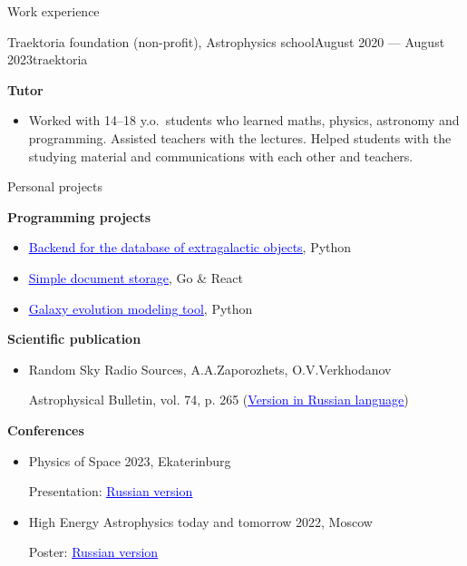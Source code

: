 \documentclass{resume} %
\newcommand{\link}[2]{\href{#1}{\textcolor{blue}{\underline{#2}}}}
\newcommand{\subheader}[2]{
	{\textbf{#1}} \ifthenelse{\equal{#2}{}}{}{\timestamp{#2}}
}
\begin{document}
\begin{rSection}{Work experience}
		\vspace{1em}

		\begin{rSubsection}{Traektoria foundation (non-profit), Astrophysics school}{August 2020 --- August 2023}{}{}{traektoria}
			\item \subheader{Tutor}{}
			\begin{itemize}
				\item Worked with 14--18 y.o.\ students who learned maths, physics, astronomy and programming. Assisted teachers with the lectures. Helped students with the studying material and communications with each other and teachers.
			\end{itemize}
		\end{rSubsection}
    \end{rSection}

	\begin{rSection}{Personal projects}
		\subheader{Programming projects}{}
		\begin{itemize}
			\item \link{https://github.com/HyperLEDA/db-app}{Backend for the database of extragalactic objects}, Python 
			\item \link{https://github.com/Kraysent/Documents}{Simple document storage}, Go \& React 
			\item \link{https://github.com/Kraysent/OMTool}{Galaxy evolution modeling tool}, Python 
		\end{itemize}

		\vspace{1em}

		\subheader{Scientific publication}{}
		\begin{itemize}
			\item Random Sky Radio Sources, A.A.Zaporozhets, O.V.Verkhodanov 
		
			Astrophysical Bulletin, vol. 74, p. 265 (\link{http://www.sao.ru/Doc-k8/Science/Public/Bulletin/Vol74/N3/ASPB265.pdf}{Version in Russian language})
		\end{itemize}

		\vspace{1em}

		\vspace{1em}

		\subheader{Conferences}{}
		\begin{itemize}
			\item Physics of Space 2023, Ekaterinburg 
			
			Presentation: \link{https://www.overleaf.com/read/mnwwgvkqxdky}{Russian version}
			\item High Energy Astrophysics today and tomorrow 2022, Moscow 
			
			Poster: \link{https://www.overleaf.com/read/cwyptqpmdtdf}{Russian version}
		\end{itemize}
	\end{rSection}
\end{document}
